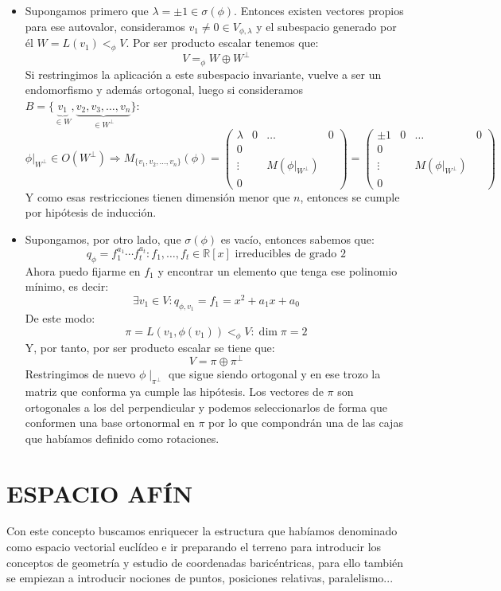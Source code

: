 \documentclass[10pt,a4paper,openright]{book}
\begin{document}
\begin{itemize}
\item Supongamos primero que $\lambda = \pm 1 \in \sigma(\phi)$. Entonces existen vectores propios para ese autovalor, consideramos $v_1 \neq 0 \in V_{\phi, \lambda}$ y el subespacio generado por él $W = L(v_1) <_\phi V$. Por ser producto escalar tenemos que:
$$V =_\phi W \oplus W^\perp$$
Si restringimos la aplicación a este subespacio invariante, vuelve a ser un endomorfismo y además ortogonal, luego si consideramos $B=\{\underbrace{v_1}_{\in W}, \underbrace{v_2, v_3, \ldots, v_n}_{\in W^\perp}\}$:
$$\phi|_{W^\perp}\in O(W^\perp)\Rightarrow M_{\{v_1,v_2,\ldots , v_n\}} (\phi) =
\left(
\begin{array}{c|ccc}
\lambda & 0 & \ldots & 0 \\
\hline
0  & & &  \\
\vdots & & M(\phi|_{W^\perp}) & \\
0 & & &
\end{array}
\right) = \left(
\begin{array}{c|ccc}
\pm 1 & 0 & \ldots & 0 \\
\hline
0  & & &  \\
\vdots & & M(\phi|_{W^\perp}) & \\
0 & & &
\end{array}
\right) $$
Y como esas restricciones tienen dimensión menor que $n$, entonces se cumple  por hipótesis de inducción.

\item Supongamos, por otro lado, que $\sigma (\phi)$ es vacío, entonces sabemos que:
$$q_\phi = f_1^{a_1} \cdots f_t^{a_t}: f_1, \ldots, f_t \in \mathbb{R}[x] \mbox{ irreducibles de grado } 2$$
Ahora puedo fijarme en $f_{1}$ y encontrar un elemento que tenga ese polinomio mínimo, es decir:
$$\exists v_1\in V: q_{\phi, v_1} = f_1 = x^2+a_1x+a_0$$
De este modo:
$$\pi = L(v_1, \phi(v_1))<_\phi V: \dim \pi = 2$$
Y, por tanto, por ser producto escalar se tiene que:
$$V = \pi \oplus \pi^\perp$$
Restringimos de nuevo $\phi\mid_{\pi^\perp}$ que sigue siendo ortogonal y en ese trozo la matriz que conforma ya cumple las hipótesis. Los vectores de $\pi$ son ortogonales a los del perpendicular y podemos seleccionarlos de forma que conformen una base ortonormal en $\pi$ por lo que compondrán una de las cajas que habíamos definido como rotaciones.
\end{itemize}

\chapter*{ESPACIO AFÍN}
Con este concepto buscamos enriquecer la estructura que habíamos denominado como espacio vectorial euclídeo e ir preparando el terreno para introducir los conceptos de geometría y estudio de coordenadas baricéntricas, para ello también se empiezan a introducir nociones de puntos, posiciones relativas, paralelismo...
\end{document}
